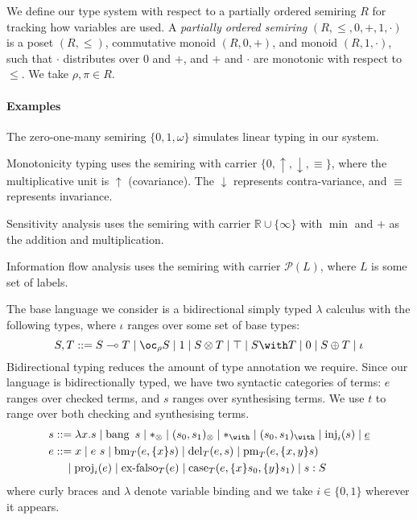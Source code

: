 We define our type system with respect to a partially ordered semiring
$R$ for tracking how variables are used. A \emph{partially ordered
  semiring} $(R, \leq, 0, +, 1 , \cdot)$ is a poset $(R, \leq)$,
commutative monoid $(R, 0, +)$, and monoid $(R, 1, \cdot)$, such that
$\cdot$ distributes over $0$ and $+$, and $+$ and $\cdot$ are
monotonic with respect to $\leq$. We take $\rho,\pi \in R$.

\paragraph{Examples}
\begin{inparaenum}
\item The zero-one-many semiring $\{0,1,\omega\}$ simulates linear
  typing in our system.
\item Monotonicity typing uses the semiring with carrier
  $\{0,\uparrow,\downarrow,\equiv\}$, where the multiplicative unit is
  $\uparrow$ (covariance). The $\downarrow$ represents
  contra-variance, and $\equiv$ represents invariance.
\item Sensitivity analysis uses the semiring with carrier
  $\mathbb{R} \cup \{\infty\}$ with $\min$ and $+$ as the addition and
  multiplication.
\item Information flow analysis uses the semiring with carrier
  $\mathcal{P}(L)$, where $L$ is some set of labels.
\end{inparaenum}

\medskip

The base language we consider is a
bidirectional\cite{DBLP:journals/toplas/PierceT00} simply typed
$\lambda$ calculus with the following types, where $\iota$ ranges over
some set of base types:
\begin{displaymath}
  S,T ::= \fun{S}{T} \mid \excl{\rho}{S} \mid \tensorOne \mid \tensor{S}{T} \mid
  \withTOne \mid \withT{S}{T} \mid \sumTZero \mid \sumT{S}{T} \mid \iota
\end{displaymath}
Bidirectional typing reduces the amount of type annotation we require.
Since our language is bidirectionally typed, we have two syntactic
categories of terms: $e$ ranges over checked terms, and $s$ ranges
over synthesising terms. We use $t$ to range over both checking and
synthesising terms.
\begin{displaymath}
  \begin{aligned}
    s &  ::= \lam{x}{s} \mid \bang{s} \mid \unit \mid \ten{s_0}{s_1} \mid \eat \mid \wth{s_0}{s_1} \mid \inj{i}{s} \mid \emb{e} \\
    e &  ::= x \mid \app{e}{s} \mid \bm{T}{e}{\bind{x}{s}} \mid \del{T}{e}{s} \mid \prm{T}{e}{\bind{x,y}{s}} \\
      & \quad \mid \proj{i}{e} \mid \exf{T}{e} \mid
             \cse{T}{e}{\bind{x}{s_0}}{\bind{y}{s_1}} \mid \ann{s}{S}
  \end{aligned}
\end{displaymath}
where curly braces and $\lambda$ denote variable binding and we take
$i \in \{0,1\}$ wherever it appears.

